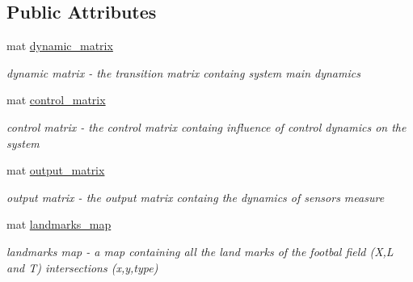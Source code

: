 \subsection*{Public Attributes}
\begin{DoxyCompactItemize}
\item 
\mbox{\label{class_robot_navigation_a1aad778b34e54f7fc85ec3ed744a444c}} 
mat \hyperlink{class_robot_navigation_a1aad778b34e54f7fc85ec3ed744a444c}{dynamic\+\_\+matrix}
\begin{DoxyCompactList}\small\item\em dynamic matrix -\/ the transition matrix containg system main dynamics \end{DoxyCompactList}\item 
\mbox{\label{class_robot_navigation_a3cd228690cd188060ee65ca92c273be5}} 
mat \hyperlink{class_robot_navigation_a3cd228690cd188060ee65ca92c273be5}{control\+\_\+matrix}
\begin{DoxyCompactList}\small\item\em control matrix -\/ the control matrix containg influence of control dynamics on the system \end{DoxyCompactList}\item 
\mbox{\label{class_robot_navigation_a30f84b9b191d662b8d6c5ba9ab4e665b}} 
mat \hyperlink{class_robot_navigation_a30f84b9b191d662b8d6c5ba9ab4e665b}{output\+\_\+matrix}
\begin{DoxyCompactList}\small\item\em output matrix -\/ the output matrix containg the dynamics of sensors measure \end{DoxyCompactList}\item 
\mbox{\label{class_robot_navigation_a1efd2001bd7cd70cc80d1c05b1c97988}} 
mat \hyperlink{class_robot_navigation_a1efd2001bd7cd70cc80d1c05b1c97988}{landmarks\+\_\+map}
\begin{DoxyCompactList}\small\item\em landmarks map -\/ a map containing all the land marks of the footbal field (X,L and T) intersections (x,y,type) \end{DoxyCompactList}\item 
\mbox{\label{class_robot_navigation_a93eb7dd2877e1f72f5741fb396adea81}} 

\end{DoxyCompactItemize}

